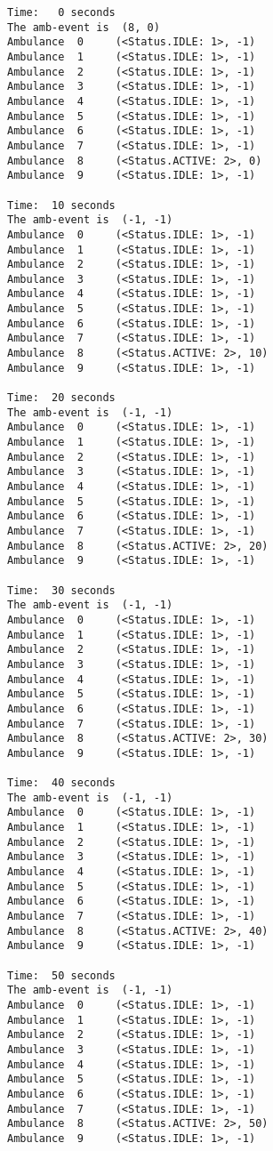 \documentclass[11pt]{article}
\begin{document}
    \begin{Verbatim}[commandchars=\\\{\}]
Time:   0 seconds
The amb-event is  (8, 0)
Ambulance  0	 (<Status.IDLE: 1>, -1)
Ambulance  1	 (<Status.IDLE: 1>, -1)
Ambulance  2	 (<Status.IDLE: 1>, -1)
Ambulance  3	 (<Status.IDLE: 1>, -1)
Ambulance  4	 (<Status.IDLE: 1>, -1)
Ambulance  5	 (<Status.IDLE: 1>, -1)
Ambulance  6	 (<Status.IDLE: 1>, -1)
Ambulance  7	 (<Status.IDLE: 1>, -1)
Ambulance  8	 (<Status.ACTIVE: 2>, 0)
Ambulance  9	 (<Status.IDLE: 1>, -1)

Time:  10 seconds
The amb-event is  (-1, -1)
Ambulance  0	 (<Status.IDLE: 1>, -1)
Ambulance  1	 (<Status.IDLE: 1>, -1)
Ambulance  2	 (<Status.IDLE: 1>, -1)
Ambulance  3	 (<Status.IDLE: 1>, -1)
Ambulance  4	 (<Status.IDLE: 1>, -1)
Ambulance  5	 (<Status.IDLE: 1>, -1)
Ambulance  6	 (<Status.IDLE: 1>, -1)
Ambulance  7	 (<Status.IDLE: 1>, -1)
Ambulance  8	 (<Status.ACTIVE: 2>, 10)
Ambulance  9	 (<Status.IDLE: 1>, -1)

Time:  20 seconds
The amb-event is  (-1, -1)
Ambulance  0	 (<Status.IDLE: 1>, -1)
Ambulance  1	 (<Status.IDLE: 1>, -1)
Ambulance  2	 (<Status.IDLE: 1>, -1)
Ambulance  3	 (<Status.IDLE: 1>, -1)
Ambulance  4	 (<Status.IDLE: 1>, -1)
Ambulance  5	 (<Status.IDLE: 1>, -1)
Ambulance  6	 (<Status.IDLE: 1>, -1)
Ambulance  7	 (<Status.IDLE: 1>, -1)
Ambulance  8	 (<Status.ACTIVE: 2>, 20)
Ambulance  9	 (<Status.IDLE: 1>, -1)

Time:  30 seconds
The amb-event is  (-1, -1)
Ambulance  0	 (<Status.IDLE: 1>, -1)
Ambulance  1	 (<Status.IDLE: 1>, -1)
Ambulance  2	 (<Status.IDLE: 1>, -1)
Ambulance  3	 (<Status.IDLE: 1>, -1)
Ambulance  4	 (<Status.IDLE: 1>, -1)
Ambulance  5	 (<Status.IDLE: 1>, -1)
Ambulance  6	 (<Status.IDLE: 1>, -1)
Ambulance  7	 (<Status.IDLE: 1>, -1)
Ambulance  8	 (<Status.ACTIVE: 2>, 30)
Ambulance  9	 (<Status.IDLE: 1>, -1)

Time:  40 seconds
The amb-event is  (-1, -1)
Ambulance  0	 (<Status.IDLE: 1>, -1)
Ambulance  1	 (<Status.IDLE: 1>, -1)
Ambulance  2	 (<Status.IDLE: 1>, -1)
Ambulance  3	 (<Status.IDLE: 1>, -1)
Ambulance  4	 (<Status.IDLE: 1>, -1)
Ambulance  5	 (<Status.IDLE: 1>, -1)
Ambulance  6	 (<Status.IDLE: 1>, -1)
Ambulance  7	 (<Status.IDLE: 1>, -1)
Ambulance  8	 (<Status.ACTIVE: 2>, 40)
Ambulance  9	 (<Status.IDLE: 1>, -1)

Time:  50 seconds
The amb-event is  (-1, -1)
Ambulance  0	 (<Status.IDLE: 1>, -1)
Ambulance  1	 (<Status.IDLE: 1>, -1)
Ambulance  2	 (<Status.IDLE: 1>, -1)
Ambulance  3	 (<Status.IDLE: 1>, -1)
Ambulance  4	 (<Status.IDLE: 1>, -1)
Ambulance  5	 (<Status.IDLE: 1>, -1)
Ambulance  6	 (<Status.IDLE: 1>, -1)
Ambulance  7	 (<Status.IDLE: 1>, -1)
Ambulance  8	 (<Status.ACTIVE: 2>, 50)
Ambulance  9	 (<Status.IDLE: 1>, -1)


\end{Verbatim}
\end{document}
